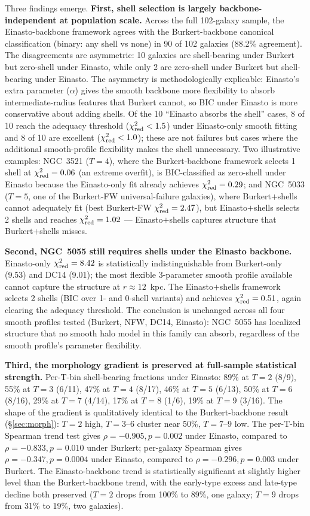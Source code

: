 \documentclass[linenumbers]{aastex701}
\newcommand{\chired}{\chi^2_{\rm red}}
\begin{document}
Three findings emerge. \textbf{First, shell selection is largely backbone-independent at population scale.} Across the full 102-galaxy sample, the Einasto-backbone framework agrees with the Burkert-backbone canonical classification (binary: any shell vs none) in 90 of 102 galaxies (88.2\% agreement). The disagreements are asymmetric: 10 galaxies are shell-bearing under Burkert but zero-shell under Einasto, while only 2 are zero-shell under Burkert but shell-bearing under Einasto. The asymmetry is methodologically explicable: Einasto's extra parameter ($\alpha$) gives the smooth backbone more flexibility to absorb intermediate-radius features that Burkert cannot, so BIC under Einasto is more conservative about adding shells. Of the 10 ``Einasto absorbs the shell'' cases, 8 of 10 reach the adequacy threshold ($\chired < 1.5$) under Einasto-only smooth fitting and 8 of 10 are excellent ($\chired < 1.0$); these are not failures but cases where the additional smooth-profile flexibility makes the shell unnecessary. Two illustrative examples: NGC~3521 ($T=4$), where the Burkert-backbone framework selects 1 shell at $\chired = 0.06$ (an extreme overfit), is BIC-classified as zero-shell under Einasto because the Einasto-only fit already achieves $\chired = 0.29$; and NGC~5033 ($T=5$, one of the Burkert-FW universal-failure galaxies), where Burkert$+$shells cannot adequately fit (best Burkert-FW $\chired = 2.47$), but Einasto$+$shells selects 2 shells and reaches $\chired = 1.02$ --- Einasto$+$shells captures structure that Burkert$+$shells misses.

\textbf{Second, NGC~5055 still requires shells under the Einasto backbone.} Einasto-only $\chired = 8.42$ is statistically indistinguishable from Burkert-only (9.53) and DC14 (9.01); the most flexible 3-parameter smooth profile available cannot capture the structure at $r \approx 12$~kpc. The Einasto$+$shells framework selects 2 shells (BIC over 1- and 0-shell variants) and achieves $\chired = 0.51$, again clearing the adequacy threshold. The conclusion is unchanged across all four smooth profiles tested (Burkert, NFW, DC14, Einasto): NGC~5055 has localized structure that no smooth halo model in this family can absorb, regardless of the smooth profile's parameter flexibility.

\textbf{Third, the morphology gradient is preserved at full-sample statistical strength.} Per-T-bin shell-bearing fractions under Einasto: 89\% at $T=2$ (8/9), 55\% at $T=3$ (6/11), 47\% at $T=4$ (8/17), 46\% at $T=5$ (6/13), 50\% at $T=6$ (8/16), 29\% at $T=7$ (4/14), 17\% at $T=8$ (1/6), 19\% at $T=9$ (3/16). The shape of the gradient is qualitatively identical to the Burkert-backbone result (\S\ref{sec:morph}): $T=2$ high, $T=3$--$6$ cluster near 50\%, $T=7$--$9$ low. The per-T-bin Spearman trend test gives $\rho = -0.905, p = 0.002$ under Einasto, compared to $\rho = -0.833, p = 0.010$ under Burkert; per-galaxy Spearman gives $\rho = -0.347, p = 0.0004$ under Einasto, compared to $\rho = -0.296, p = 0.003$ under Burkert. The Einasto-backbone trend is statistically significant at slightly higher level than the Burkert-backbone trend, with the early-type excess and late-type decline both preserved ($T=2$ drops from 100\% to 89\%, one galaxy; $T=9$ drops from 31\% to 19\%, two galaxies).
\end{document}

